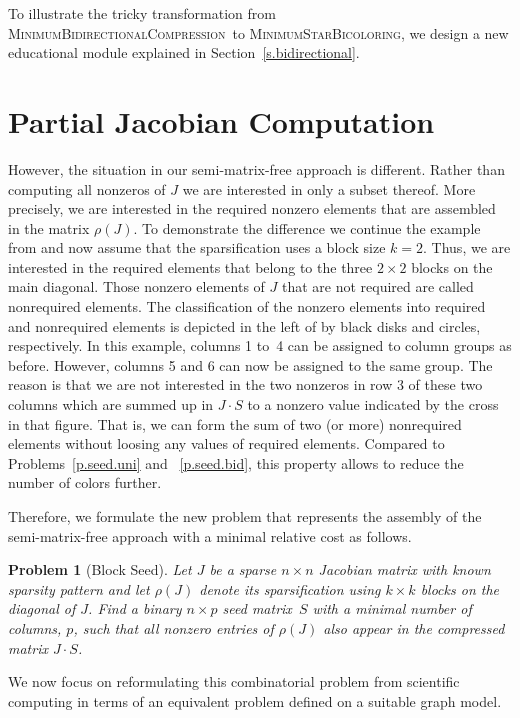 \documentclass[12pt, oneside]{book}
\newtheorem{problem}{Problem}
\newcommand{\figref}[1]{Figure~\protect\ref{#1}}
\newcommand{\sparsifysymbol}{\ensuremath{\rho}}
\newcommand{\sparsify}[1]{\ensuremath{\sparsifysymbol(#1)}}
\newcommand{\MinStaBic}{\textsc{MinimumStarBicoloring}}
\newcommand{\MinBidCom}{\textsc{MinimumBidirectionalCompression}}
\begin{document}
To illustrate the tricky transformation from \MinBidCom\ to \MinStaBic, we design a new
educational module explained in Section~\ref{s.bidirectional}.

\section{Partial Jacobian Computation}
However, the situation in our semi-matrix-free approach is different. Rather than
computing all nonzeros of $J$ we are interested in only a subset thereof. More precisely,
we are interested in the required nonzero elements that are assembled in the matrix
\sparsify{J}. To demonstrate the difference we continue the example from 
and now assume that the sparsification uses a block size $k=2$. Thus, we are interested
in the required elements that belong to the three $2 \times 2$ blocks on the main
diagonal. Those nonzero elements of $J$ that are not required are called nonrequired
elements. The classification of the nonzero elements into required and nonrequired
elements is depicted in the left of 
by black disks and circles,
respectively. In this example, columns 1 to~4 can be assigned to column groups as before.
However, columns 5 and 6 can now be assigned to the same group. The reason is that we are
not interested in the two nonzeros in row 3 of these two columns which are summed up in
$J\cdot S$ to a nonzero value indicated by the cross in that figure. That is, we can form
the sum of two (or more) nonrequired elements without loosing any values of required
elements. Compared to Problems~\ref{p.seed.uni} and ~\ref{p.seed.bid}, 
this property allows to reduce the number of
colors further.

Therefore, we formulate the new problem that represents the assembly of the
semi-matrix-free approach with a minimal relative cost as follows.
%
\begin{problem}[Block Seed]
\label{p:block}
%
Let $J$ be a sparse $n \times n$ Jacobian matrix with known sparsity pattern and let
\sparsify{J} denote its sparsification using $k \times k$ blocks on the diagonal of $J$.
Find a binary $n \times p$ seed matrix~$S$ with a minimal number of columns, $p$, such
that all nonzero entries of \sparsify{J} also appear in the compressed matrix $J \cdot
S$.
\end{problem}

We now focus on reformulating this combinatorial problem from
scientific computing in terms of an equivalent problem defined on a suitable graph model.
\end{document}
